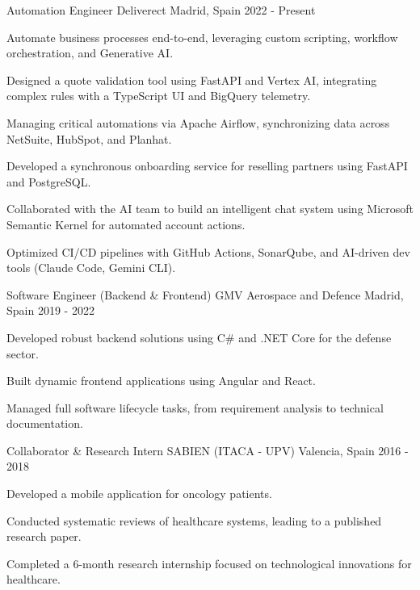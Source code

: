 \begin{cventries}
  \cventry
    {Automation Engineer}
    {Deliverect}
    {Madrid, Spain}
    {2022 - Present}
    {\begin{cvitems}
      \item {Automate business processes end-to-end, leveraging custom scripting, workflow orchestration, and Generative AI.}
      \item {Designed a quote validation tool using FastAPI and Vertex AI, integrating complex rules with a TypeScript UI and BigQuery telemetry.}
      \item {Managing critical automations via Apache Airflow, synchronizing data across NetSuite, HubSpot, and Planhat.}
      \item {Developed a synchronous onboarding service for reselling partners using FastAPI and PostgreSQL.}
      \item {Collaborated with the AI team to build an intelligent chat system using Microsoft Semantic Kernel for automated account actions.}
      \item {Optimized CI/CD pipelines with GitHub Actions, SonarQube, and AI-driven dev tools (Claude Code, Gemini CLI).}
    \end{cvitems}}
  \cventry
    {Software Engineer (Backend \& Frontend)}
    {GMV Aerospace and Defence}
    {Madrid, Spain}
    {2019 - 2022}
    {\begin{cvitems}
      \item {Developed robust backend solutions using C\# and .NET Core for the defense sector.}
      \item {Built dynamic frontend applications using Angular and React.}
      \item {Managed full software lifecycle tasks, from requirement analysis to technical documentation.}
    \end{cvitems}}
  \cventry
    {Collaborator \& Research Intern}
    {SABIEN (ITACA - UPV)}
    {Valencia, Spain}
    {2016 - 2018}
    {\begin{cvitems}
      \item {Developed a mobile application for oncology patients.}
      \item {Conducted systematic reviews of healthcare systems, leading to a published research paper.}
      \item {Completed a 6-month research internship focused on technological innovations for healthcare.}
    \end{cvitems}}
\end{cventries}